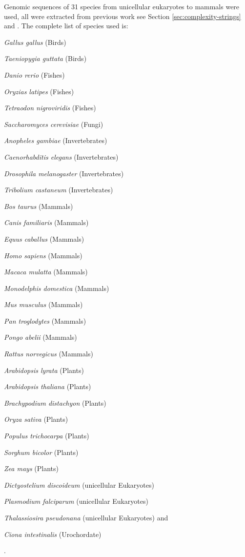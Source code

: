 Genomic sequences of 31 species from unicellular eukaryotes to mammals were used, all were extracted from previous work see Section \ref{sec:complexity-strings} and . The complete list of species used is: \begin{inparaenum}[\itshape 1)]
\item \textit{Gallus gallus} (Birds)
\item \textit{Taeniopygia guttata} (Birds)
\item \textit{Danio rerio} (Fishes)
\item \textit{Oryzias latipes} (Fishes)
\item \textit{Tetraodon nigroviridis} (Fishes)
\item \textit{Saccharomyces cerevisiae} (Fungi)
\item \textit{Anopheles gambiae} (Invertebrates)
\item \textit{Caenorhabditis elegans} (Invertebrates)
\item \textit{Drosophila melanogaster} (Invertebrates)
\item \textit{Tribolium castaneum} (Invertebrates)
\item \textit{Bos taurus} (Mammals)
\item \textit{Canis familiaris} (Mammals)
\item \textit{Equus caballus} (Mammals)
\item \textit{Homo sapiens} (Mammals)
\item \textit{Macaca mulatta} (Mammals)
\item \textit{Monodelphis domestica} (Mammals)
\item \textit{Mus musculus} (Mammals)
\item \textit{Pan troglodytes} (Mammals)
\item \textit{Pongo abelii} (Mammals)
\item \textit{Rattus norvegicus} (Mammals)
\item \textit{Arabidopsis lyrata} (Plants)
\item \textit{Arabidopsis thaliana} (Plants)
\item \textit{Brachypodium distachyon} (Plants)
\item \textit{Oryza sativa} (Plants)
\item \textit{Populus trichocarpa} (Plants)
\item \textit{Sorghum bicolor} (Plants)
\item \textit{Zea mays} (Plants)
\item \textit{Dictyostelium discoideum} (unicellular Eukaryotes)
\item \textit{Plasmodium falciparum} (unicellular Eukaryotes)
\item \textit{Thalassiosira pseudonana} (unicellular Eukaryotes)
and \item \textit{Ciona intestinalis} (Urochordate)
\end{inparaenum}.

